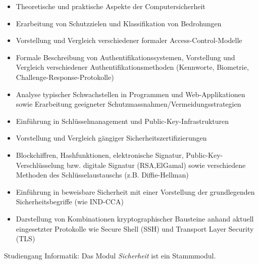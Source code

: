 \begin{module}
\begin{content}
\begin{itemize}\item  Theoretische und praktische Aspekte der Computersicherheit  \item Erarbeitung von Schutzzielen und Klassifikation von Bedrohungen  \item Vorstellung und Vergleich verschiedener formaler Access-Control-Modelle  \item Formale Beschreibung von Authentifikationssystemen, Vorstellung und Vergleich verschiedener Authentifikationsmethoden (Kennworte, Biometrie, Challenge-Response-Protokolle)  \item Analyse typischer Schwachstellen in Programmen und Web-Applikationen sowie Erarbeitung geeigneter Schutzmassnahmen/Vermeidungsstrategien  \item Einführung in Schlüsselmanagement und Public-Key-Infrastrukturen  \item  Vorstellung und Vergleich gängiger Sicherheitszertifizierungen  \item Blockchiffren, Hashfunktionen, elektronische Signatur, Public-Key-Verschlüsselung bzw. digitale Signatur (RSA,ElGamal) sowie verschiedene Methoden des Schlüsselaustauschs (z.B. Diffie-Hellman)  \item Einführung in beweisbare Sicherheit mit einer Vorstellung der grundlegenden Sicherheitsbegriffe (wie IND-CCA)  \item  Darstellung von Kombinationen kryptographischer Bausteine anhand aktuell eingesetzter Protokolle wie Secure Shell (SSH) und Transport Layer Security (TLS)  \end{itemize}
\end{content}

\begin{remarks}Studiengang Informatik: Das Modul \emph{Sicherheit }ist ein Stammmodul.

\end{remarks}

\end{module}

